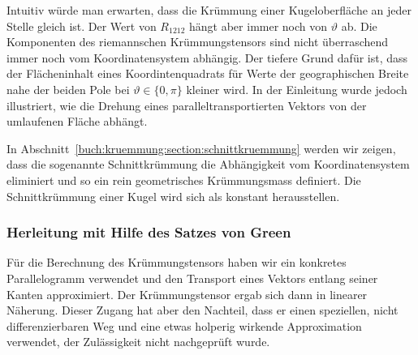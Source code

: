 Intuitiv würde man erwarten, dass die Krümmung einer Kugeloberfläche
an jeder Stelle gleich ist.
Der Wert von $R_{1212}$ hängt aber immer noch von $\vartheta$ ab.
Die Komponenten des riemannschen Krümmungstensors sind nicht überraschend
immer noch vom Koordinatensystem abhängig.
Der tiefere Grund dafür ist, dass der Flächeninhalt eines Koordintenquadrats
für Werte der geographischen Breite nahe der beiden Pole bei
$\vartheta \in \{0,\pi\}$ kleiner wird.
In der Einleitung wurde jedoch illustriert, wie die Drehung eines
paralleltransportierten Vektors von der umlaufenen Fläche abhängt.

In Abschnitt~\ref{buch:kruemmung:section:schnittkruemmung}
werden wir zeigen, dass die sogenannte Schnittkrümmung die
Abhängigkeit vom Koordinatensystem eliminiert und so ein
rein geometrisches Krümmungsmass definiert.
Die Schnittkrümmung einer Kugel wird sich als konstant herausstellen.

\subsubsection{Herleitung mit Hilfe des Satzes von Green}
Für die Berechnung des Krümmungstensors haben wir ein konkretes
Parallelogramm verwendet und den Transport eines Vektors entlang
seiner Kanten approximiert.
Der Krümmungstensor ergab sich dann in linearer Näherung.
Dieser Zugang hat aber den Nachteil, dass er einen speziellen, nicht
differenzierbaren Weg und eine etwas holperig wirkende Approximation
verwendet, der Zulässigkeit nicht nachgeprüft wurde.


